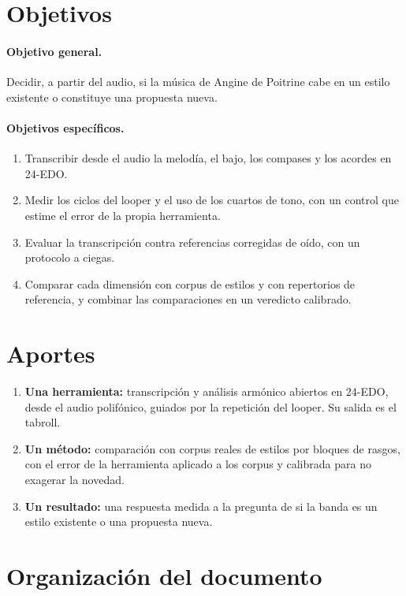 \section{Objetivos}

\paragraph{Objetivo general.} Decidir, a partir del audio, si la música de Angine de Poitrine cabe en un estilo
existente o constituye una propuesta nueva.

\paragraph{Objetivos específicos.}
\begin{enumerate}
  \item Transcribir desde el audio la melodía, el bajo, los compases y los acordes en 24-EDO.
  \item Medir los ciclos del looper y el uso de los cuartos de tono, con un control que estime el error de la propia
  herramienta.
  \item Evaluar la transcripción contra referencias corregidas de oído, con un protocolo a ciegas.
  \item Comparar cada dimensión con corpus de estilos y con repertorios de referencia, y combinar las comparaciones en
  un veredicto calibrado.
\end{enumerate}

\section{Aportes}

\begin{enumerate}
  \item \textbf{Una herramienta:} transcripción y análisis armónico abiertos en 24-EDO, desde el audio polifónico, guiados
  por la repetición del looper. Su salida es el tabroll.
  \item \textbf{Un método:} comparación con corpus reales de estilos por bloques de rasgos, con el error de la
  herramienta aplicado a los corpus y calibrada para no exagerar la novedad.
  \item \textbf{Un resultado:} una respuesta medida a la pregunta de si la banda es un estilo existente o una propuesta
  nueva.
\end{enumerate}

\section{Organización del documento}


